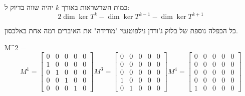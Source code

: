 \documentclass{tstextbook}
\begin{document}
\begin{proposition}
כמות השרשראות באורך \(k\) יהיה שווה בדיוק ל:
$$2\dim \ker T^k - \dim \ker T^{k-1} - \dim \ker T^{k+1}$$

\end{proposition}
\begin{proposition}
כל הכפלה נוספת של בלוק ג'ורדן נילפוטנטי "מורידה" את האיברים רמה אחת באלכסון.

\end{proposition}
\begin{example}
M^2 = \left[\begin{matrix}0 & 0 & 0 & 0 & 0\0 & 0 & 0 & 0 & 0\1 & 0 & 0 & 0 & 0\0 & 1 & 0 & 0 & 0\0 & 0 & 1 & 0 & 0\end{matrix}\right]$$$$
$$M^1 = \left[\begin{matrix}0 & 0 & 0 & 0 & 0\\1 & 0 & 0 & 0 & 0\\0 & 1 & 0 & 0 & 0\\0 & 0 & 1 & 0 & 0\\0 & 0 & 0 & 1 & 0\end{matrix}\right]M^3 = \left[\begin{matrix}0 & 0 & 0 & 0 & 0\\0 & 0 & 0 & 0 & 0\\0 & 0 & 0 & 0 & 0\\1 & 0 & 0 & 0 & 0\\0 & 1 & 0 & 0 & 0\end{matrix}\right]
M^4 = \left[\begin{matrix}0 & 0 & 0 & 0 & 0\\0 & 0 & 0 & 0 & 0\\0 & 0 & 0 & 0 & 0\\0 & 0 & 0 & 0 & 0\\1 & 0 & 0 & 0 & 0\end{matrix}\right]$$

\end{example}
\end{document}
